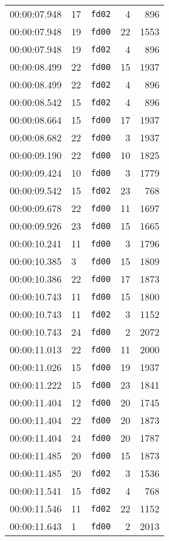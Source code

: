 \documentclass{article}
\begin{document}
\begin{longtable}{lllrr}
00:00:07.948 & 17 & \texttt{fd02} & 4 & 896 \\
00:00:07.948 & 19 & \texttt{fd00} & 22 & 1553 \\
00:00:07.948 & 19 & \texttt{fd02} & 4 & 896 \\
00:00:08.499 & 22 & \texttt{fd00} & 15 & 1937 \\
00:00:08.499 & 22 & \texttt{fd02} & 4 & 896 \\
00:00:08.542 & 15 & \texttt{fd02} & 4 & 896 \\
00:00:08.664 & 15 & \texttt{fd00} & 17 & 1937 \\
00:00:08.682 & 22 & \texttt{fd00} & 3 & 1937 \\
00:00:09.190 & 22 & \texttt{fd00} & 10 & 1825 \\
00:00:09.424 & 10 & \texttt{fd00} & 3 & 1779 \\
00:00:09.542 & 15 & \texttt{fd02} & 23 & 768 \\
00:00:09.678 & 22 & \texttt{fd00} & 11 & 1697 \\
00:00:09.926 & 23 & \texttt{fd00} & 15 & 1665 \\
00:00:10.241 & 11 & \texttt{fd00} & 3 & 1796 \\
00:00:10.385 & 3 & \texttt{fd00} & 15 & 1809 \\
00:00:10.386 & 22 & \texttt{fd00} & 17 & 1873 \\
00:00:10.743 & 11 & \texttt{fd00} & 15 & 1800 \\
00:00:10.743 & 11 & \texttt{fd02} & 3 & 1152 \\
00:00:10.743 & 24 & \texttt{fd00} & 2 & 2072 \\
00:00:11.013 & 22 & \texttt{fd00} & 11 & 2000 \\
00:00:11.026 & 15 & \texttt{fd00} & 19 & 1937 \\
00:00:11.222 & 15 & \texttt{fd00} & 23 & 1841 \\
00:00:11.404 & 12 & \texttt{fd00} & 20 & 1745 \\
00:00:11.404 & 22 & \texttt{fd00} & 20 & 1873 \\
00:00:11.404 & 24 & \texttt{fd00} & 20 & 1787 \\
00:00:11.485 & 20 & \texttt{fd00} & 15 & 1873 \\
00:00:11.485 & 20 & \texttt{fd02} & 3 & 1536 \\
00:00:11.541 & 15 & \texttt{fd02} & 4 & 768 \\
00:00:11.546 & 11 & \texttt{fd02} & 22 & 1152 \\
00:00:11.643 & 1 & \texttt{fd00} & 2 & 2013 \\

\end{longtable}
\end{document}
